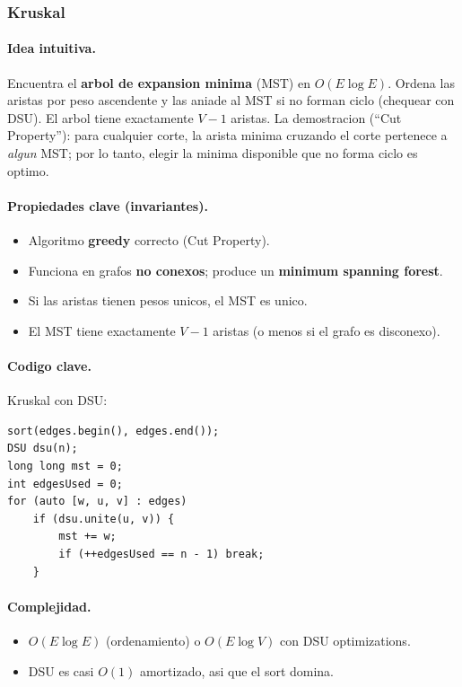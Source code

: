 ﻿\subsubsection{Kruskal}

\paragraph{Idea intuitiva.}
Encuentra el \textbf{arbol de expansion minima} (MST) en $O(E \log E)$. Ordena las aristas por peso ascendente y las aniade al MST si no forman ciclo (chequear con DSU). El arbol tiene exactamente $V - 1$ aristas. La demostracion (``Cut Property''): para cualquier corte, la arista minima cruzando el corte pertenece a \emph{algun} MST; por lo tanto, elegir la minima disponible que no forma ciclo es optimo.

\paragraph{Propiedades clave (invariantes).}
\begin{itemize}\setlength\itemsep{0pt}
	\item Algoritmo \textbf{greedy} correcto (Cut Property).
	\item Funciona en grafos \textbf{no conexos}; produce un \textbf{minimum spanning forest}.
	\item Si las aristas tienen pesos unicos, el MST es unico.
	\item El MST tiene exactamente $V - 1$ aristas (o menos si el grafo es disconexo).
\end{itemize}

\paragraph{Codigo clave.}
Kruskal con DSU:
\begin{verbatim}
sort(edges.begin(), edges.end());
DSU dsu(n);
long long mst = 0;
int edgesUsed = 0;
for (auto [w, u, v] : edges)
    if (dsu.unite(u, v)) {
        mst += w;
        if (++edgesUsed == n - 1) break;
    }
\end{verbatim}

\paragraph{Complejidad.}
\begin{itemize}\setlength\itemsep{0pt}
	\item $O(E \log E)$ (ordenamiento) o $O(E \log V)$ con DSU optimizations.
	\item DSU es casi $O(1)$ amortizado, asi que el sort domina.
\end{itemize}

